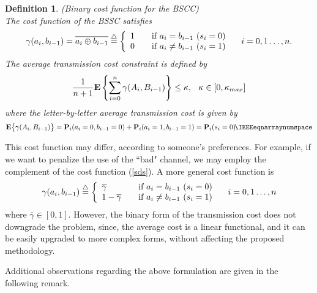 \documentclass[11pt, a4paper, journal,onecolumn]{IEEEtran}
\newcommand{\sr}{\stackrel}
\newcommand{\tri}{\sr{\triangle}{=}}
\newcommand{\bea}{\begin{eqnarray}}
\newcommand{\eea}{\end{eqnarray}}
\newcommand{\nms}{\IEEEeqnarraynumspace}
\newcommand{\hso}{\hspace{.1in}}
\newtheorem{definition}{Definition}[section]
\begin{document}
\begin{definition}(Binary cost function for the BSCC)\label{bin_cf}\ \\
The cost function of the BSSC satisfies
 \begin{equation}
{\gamma}(a_i,b_{i-1})=\overline{a_i\oplus b_{i-1}}  \tri\left\{
  \begin{array}{l l}
    1 & \quad \text{if $a_i=b_{i-1}$ $(s_i=0)$}\\
    0 & \quad \text{if $a_i\neq b_{i-1}$ $(s_i=1)$ }
 \label{sds} \end{array}  \right. \hso i=0,1 \ldots, n.
 \end{equation}
The average transmission cost constraint is defined by
\bea
\frac{1}{n+1}{\bf E}\left\{\sum_{i=0}^{n}{\gamma}(A_i,B_{i-1})\right\}\leq \kappa, \hso \kappa\in[0,\kappa_{max}] \label{qvcostc1_av} 
\eea
where the  letter-by-letter average transmission cost is given by
\bea
{\bf E}\big\{{\gamma}(A_i,B_{i-1})\big\}
={\bf P}_i(a_i=0,b_{i-1}=0)+{\bf P}_i(a_i=1,b_{i-1}=1)={\bf P}_i(s_i=0).
\hspace{-0.15cm}\nms \label{qvcostc1} 
\eea
\end{definition}
\par This cost function may differ, according to someone's preferences. For example, if we want to penalize the use of the ``bad" channel, we may employ the complement of the cost function (\ref{sds}). A more general cost function is 
 \begin{equation}
{\gamma}(a_i,b_{i-1}) \tri  \left\{
  \begin{array}{l l}
    \overline{\gamma} & \quad \text{if $a_i=b_{i-1}$ $(s_i=0)$}\\
    1-\overline{\gamma} & \quad \text{if $a_i\neq b_{i-1}$ $(s_i=1)$ }
 \label{sds1} \end{array}  \right. \hso i=0,1 \ldots, n
 \end{equation}
where $\overline{\gamma}\in[0,1]$. However, the binary form of the transmission cost does not downgrade the problem, since, the average cost is a linear functional, and  it can be easily upgraded to more complex forms, without affecting the proposed methodology.
\par Additional observations regarding the above formulation are given in the following remark. \\
\end{document}
